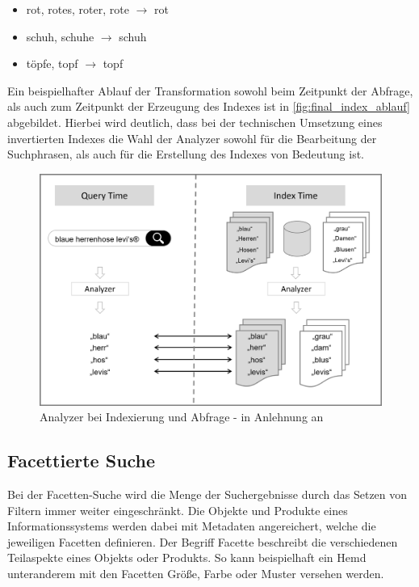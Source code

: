 \begin{itemize}
    \item rot, rotes, roter, rote $\rightarrow$ rot
    \item schuh, schuhe $\rightarrow$ schuh
    \item töpfe, topf $\rightarrow$ topf
\end{itemize}

Ein beispielhafter Ablauf der Transformation sowohl beim Zeitpunkt der Abfrage, als auch zum Zeitpunkt der Erzeugung des Indexes ist in \autoref{fig:final_index_ablauf} abgebildet. Hierbei wird deutlich, dass bei der technischen Umsetzung eines invertierten Indexes die Wahl der Analyzer sowohl für die Bearbeitung der Suchphrasen, als auch für die Erstellung des Indexes von Bedeutung ist.

\begin{figure}[H]
    \centering
    \includegraphics[width=0.7\linewidth]{images/Query_Index_Time.png}
    \caption{Analyzer bei Indexierung und Abfrage - in Anlehnung an \cite{SebastianRuss.2017}}
    \label{fig:final_index_ablauf}
\end{figure}

\subsection{Facettierte Suche\label{subsec2.3.3:Unterunterpunkt-3}}

Bei der Facetten-Suche wird die Menge der Suchergebnisse durch das Setzen von Filtern immer weiter eingeschränkt. Die Objekte und Produkte eines Informationssystems werden dabei mit Metadaten angereichert, welche die jeweiligen Facetten definieren. Der Begriff Facette beschreibt die verschiedenen Teilaspekte eines Objekts oder Produkts. So kann beispielhaft ein \glqq Hemd\grqq{} unteranderem mit den Facetten \glqq Größe\grqq{}, \glqq Farbe\grqq{} oder \glqq Muster\grqq{} versehen werden.

